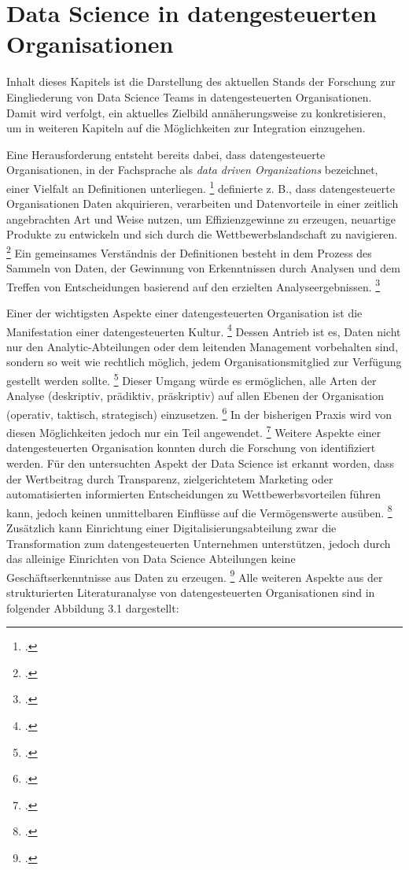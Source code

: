 \chapter{Data Science in datengesteuerten Organisationen}

Inhalt dieses Kapitels ist die Darstellung des aktuellen Stands der Forschung zur Eingliederung von Data Science Teams in datengesteuerten Organisationen.
Damit wird verfolgt, ein aktuelles Zielbild annäherungsweise zu konkretisieren, um in weiteren Kapiteln auf die Möglichkeiten zur Integration einzugehen.

Eine Herausforderung entsteht bereits dabei, dass datengesteuerte Organisationen, in der Fachsprache als \textit{data driven Organizations} bezeichnet, einer Vielfalt an Definitionen unterliegen. \footcite[prenote][postnote]{(several definitons of DDOs)}
 definierte z. B., dass datengesteuerte Organisationen Daten akquirieren, verarbeiten und Datenvorteile in einer zeitlich angebrachten Art und Weise nutzen, um Effizienzgewinne zu erzeugen, neuartige Produkte zu entwickeln und sich durch die Wettbewerbslandschaft zu navigieren. \footcite[prenote][postnote]{DDO definition}
Ein gemeinsames Verständnis der Definitionen besteht in dem Prozess des Sammeln von Daten, der Gewinnung von Erkenntnissen durch Analysen und dem Treffen von Entscheidungen basierend auf den erzielten Analyseergebnissen. \footcite[prenote][postnote]{looking into DDO definitions}

Einer der wichtigsten Aspekte einer datengesteuerten Organisation ist die Manifestation einer datengesteuerten Kultur. \footcite[prenote][postnote]{data-driven culture}
Dessen Antrieb ist es, Daten nicht nur den Analytic-Abteilungen oder dem leitenden Management vorbehalten sind, sondern so weit wie rechtlich möglich, jedem Organisationsmitglied zur Verfügung gestellt werden sollte. \footcite[prenote][postnote]{ddos democratize data}
Dieser Umgang würde es ermöglichen, alle Arten der Analyse (deskriptiv, prädiktiv, präskriptiv) auf allen Ebenen der Organisation (operativ, taktisch, strategisch) einzusetzen. \footcite[prenote][postnote]{typees of analytics}
In der bisherigen Praxis wird von diesen Möglichkeiten jedoch nur ein Teil angewendet. \footcite[prenote][postnote]{typees}
Weitere Aspekte einer datengesteuerten Organisation konnten durch die Forschung von  identifiziert werden.
Für den untersuchten Aspekt der Data Science ist erkannt worden, dass der Wertbeitrag durch Transparenz, zielgerichtetem Marketing oder automatisierten informierten Entscheidungen zu Wettbewerbsvorteilen führen kann, jedoch keinen unmittelbaren Einflüsse auf die Vermögenswerte ausüben. \footcite[prenote][postnote]{data science brings value}
Zusätzlich kann Einrichtung einer Digitalisierungsabteilung zwar die Transformation zum datengesteuerten Unternehmen unterstützen, jedoch durch das alleinige Einrichten von Data Science Abteilungen keine Geschäftserkenntnisse aus Daten zu erzeugen. \footcite[prenote][postnote]{data science teams}
Alle weiteren Aspekte aus der strukturierten Literaturanalyse von datengesteuerten Organisationen sind in folgender Abbildung 3.1 dargestellt:

